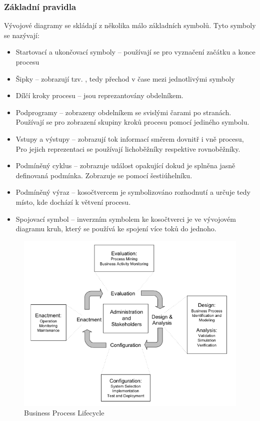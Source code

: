 \documentclass[]{article}
\begin{document}
\subsubsection{Základní pravidla}
Vývojové diagramy se skládají z několika málo základních symbolů. Tyto symboly se nazývají: \cite{Chytil2005}

\begin{itemize}
\item Startovací a ukončovací symboly – používají se pro vyznačení začátku a konce procesu
\item Šipky – zobrazují tzv. , tedy přechod v čase mezi jednotlivými symboly
\item Dílčí kroky procesu – jsou reprezantovány obdelníkem.
\item Podprogramy – zobrazeny obdelníkem se svislými čarami po stranách. Používají se pro zobrazení skupiny kroků procesu pomocí jediného symbolu.
\item Vstupy a výstupy – zobrazují tok informací směrem dovnitř i vně procesu, Pro jejich reprezentaci se používají lichoběžníky respektive rovnoběžníky.
\item Podmíněný cyklus – zobrazuje událost opakující dokud je splněna jasně definovaná podmínka. Zobrazuje se pomocí šestiúhelníku.
\item Podmíněný výraz – kosočtvercem je symbolizováno rozhodnutí a určuje tedy místo, kde dochází k větvení procesu.
\item Spojovací symbol – inverzním symbolem ke kosočtverci je ve vývojovém diagramu kruh, který se používá ke spojení více toků do jednoho.
\end{itemize}

\begin{figure}[H]\centering %
\includegraphics[width=1.0\textwidth]{obrazky/processLifecycle}
\caption{Business Process Lifecycle \cite{Weske2007}}
\label{fig:BusinessProcessLifecycle}
\end{figure}
\end{document}
